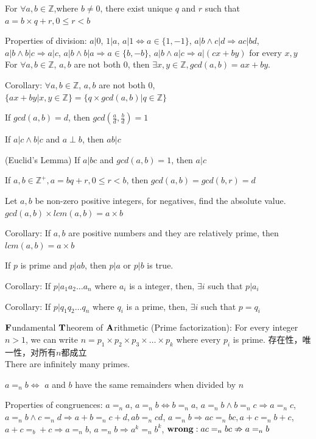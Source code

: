 \documentclass[12pt,a4paper]{ctexrep}
\begin{document}
For $\forall a,b \in \mathbb{Z}$,where $b \neq 0$, there exist unique $q$ and $r$ such that $a = b\times q+r, 0\leq r<b$

Properties of division:
$a|0$, $1|a$, $a|1 \Leftrightarrow a\in \{1,-1\}$, $a|b \wedge c|d \Rightarrow ac|bd$, $a|b \wedge b|c \Rightarrow a|c$, $a|b \wedge b|a \Rightarrow a \in \{b,-b\}$, $a|b \wedge a|c \Rightarrow a|(cx+by)$ for every $x,y$\\

For $\forall a,b \in \mathbb{Z}$, $a,b$ are not both 0, then $\exists x,y \in \mathbb{Z}, gcd(a,b) = ax+by$.

Corollary:
$\forall a,b \in \mathbb{Z}$, $a,b$ are not both 0, $\{ax+by|x,y \in \mathbb{Z}\} = \{q \times gcd(a,b)|q \in \mathbb{Z}\}$

If $gcd(a,b)=d$, then $gcd(\frac{a}{d},\frac{b}{d}) = 1$

If $a|c \wedge b|c$ and $a \perp b$, then $ab|c$

(Euclid's Lemma)
If $a|bc$ and $gcd(a,b) = 1$, then $a|c$

If $a,b \in \mathbb{Z}^+, a = bq+r, 0\leqslant r < b$, then $gcd(a,b) = gcd(b,r) = d$

Let $a,b$ be non-zero positive integers, for negatives, find the absolute value. $gcd(a,b) \times lcm(a,b) = a\times b$

Corollary:
If $a,b$ are positive numbers and they are relatively prime, then $lcm(a,b) = a \times b$

If $p$ is prime and $p|ab$, then $p|a$ or $p|b$ is true.

Corollary:
If $p|a_1a_2\dots a_n$ where $a_i$ is a integer, then, $\exists i$ such that $p|a_i$

Corollary:
If $p|q_1q_2\dots q_n$ where $q_i$ is a prime, then, $\exists i$ such that $p = q_i$

$\bold{F}$undamental $\bold{T}$heorem of $\bold{A}$rithmetic (Prime factorization):
For every integer $n>1$, we can write $n = p_1\times p_2 \times p_3 \times \dots \times p_k$ where every $p_i$ is prime. 存在性，唯一性，对所有$n$都成立\\

There are infinitely many primes.

$a=_nb \iff$ $a$ and $b$ have the same remainders when divided by $n$

Properties of congruences:
$a=_na$, $a=_nb \Leftrightarrow b=_na$, $a=_nb \wedge b=_nc \Rightarrow a=_nc$, $a=_nb \wedge c=_nd \Rightarrow a+b=_nc+d , ab=_ncd$, $a=_nb \Rightarrow ac=_nbc, a+c =_n b+c$, $a+c=_b+c \Rightarrow a=_nb$, $a=_nb \Rightarrow a^k=_nb^k$, $\bold{wrong:}\; ac=_nbc \nRightarrow a=_nb$\\
\end{document}
